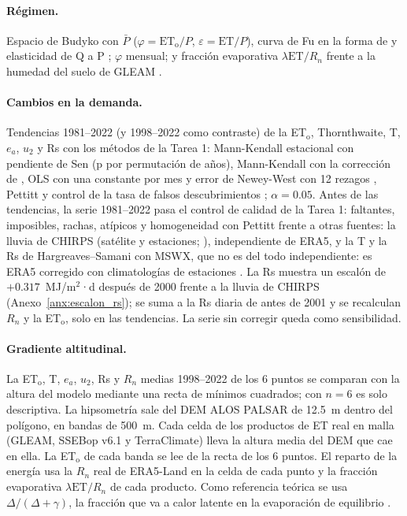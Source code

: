 \documentclass[11pt,letterpaper]{article}
\newcommand{\ETo}{ET$_\mathrm{o}$}
\begin{document}
\paragraph{Régimen.} Espacio de Budyko con $\bar{P}$ ($\varphi = \mathrm{ET_o}/P$, $\varepsilon = \mathrm{ET}/P$),
curva de Fu en la forma de \citet{zhang2004} y elasticidad de Q a P \citep{sankarasubramanian2001}; $\varphi$
mensual; y fracción evaporativa $\lambda\mathrm{ET}/R_n$ frente a la humedad del suelo de GLEAM
\citep{seneviratne2010}.

\paragraph{Cambios en la demanda.} Tendencias 1981--2022 (y 1998--2022 como contraste) de la \ETo, Thornthwaite, T, $e_a$, $u_2$ y Rs con los
métodos de la Tarea 1: Mann-Kendall estacional \citep{hirsch1982} con pendiente de Sen \citep{sen1968} (p por
permutación de años), Mann-Kendall con la corrección de \citet{hamed1998}, OLS con una constante por mes y error de
Newey-West con 12 rezagos \citep{newey1987}, Pettitt \citep{pettitt1979} y control de la tasa de falsos
descubrimientos \citep{benjamini1995}; $\alpha = 0.05$. Antes de las tendencias, la serie 1981--2022 pasa el
control de calidad de la Tarea 1: faltantes, imposibles, rachas, atípicos y homogeneidad con Pettitt frente a otras
fuentes: la lluvia de CHIRPS (satélite y estaciones; \citealp{funk2015}), independiente de ERA5, y la T y la Rs de
Hargreaves--Samani con MSWX, que no es del todo independiente: es ERA5 corregido con climatologías de estaciones
\citep{beck2022}. La Rs muestra un escalón de $+0.317$~MJ/m$^2$·d después de 2000
frente a la lluvia de CHIRPS (Anexo~\ref{anx:escalon_rs}); se suma a la Rs diaria de antes de 2001 y se recalculan $R_n$ y la \ETo, solo en las
tendencias. La serie sin corregir queda como sensibilidad.

\paragraph{Gradiente altitudinal.} La \ETo, T, $e_a$, $u_2$, Rs y $R_n$ medias 1998--2022 de los 6 puntos se
comparan con la altura del modelo mediante una recta de mínimos cuadrados; con $n = 6$ es solo descriptiva. La
hipsometría sale del DEM ALOS PALSAR de 12.5~m \citep{asf_alos} dentro del polígono, en bandas de 500~m. Cada celda de los productos de ET real
en malla (GLEAM, SSEBop v6.1 y TerraClimate) lleva la altura media del DEM que cae en ella. La \ETo{} de cada banda se
lee de la recta de los 6 puntos. El reparto de la energía usa la $R_n$ real de ERA5-Land en la celda de cada punto y la
fracción evaporativa $\lambda\mathrm{ET}/R_n$ de cada producto. Como referencia teórica se usa $\Delta/(\Delta+\gamma)$,
la fracción que va a calor latente en la evaporación de equilibrio \citep{priestley1972}.
\end{document}
